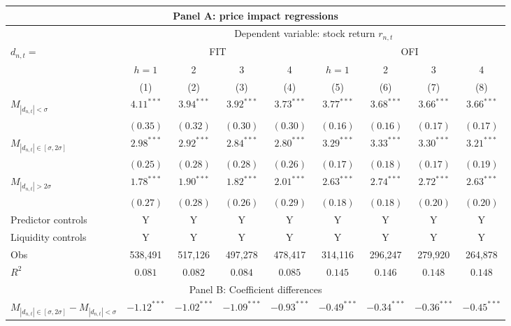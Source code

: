 \begin{tabular}{lcccccccc}
  \hline \multicolumn{9}{c}{Panel A: price impact regressions} \\
 \hline 
    & \multicolumn{8}{c}{Dependent variable: stock return $r_{n,t}$} \\

    \cmidrule(l){2-9} $d_{n,t} = $ & \multicolumn{4}{c}{FIT} & \multicolumn{4}{c}{OFI} \\
 \cmidrule(l){2-5} \cmidrule(l){6-9} 
  & $h=1$ & 2 & 3 & 4 & $h=1$ & 2 & 3 & 4 \\ 
   \cmidrule(l){2-5} \cmidrule(l){6-9} \vspace{5pt} & (1) & (2) & (3) & (4) & (5) & (6) & (7) & (8) \\ 
  $M_{|d_{n,t}| < \sigma}$ & $4.11^{***}$ & $3.94^{***}$ & $3.92^{***}$ & $3.73^{***}$ & $3.77^{***}$ & $3.68^{***}$ & $3.66^{***}$ & $3.66^{***}$ \\ 
   & $(0.35)$ & $(0.32)$ & $(0.30)$ & $(0.30)$ & $(0.16)$ & $(0.16)$ & $(0.17)$ & $(0.17)$ \\ 
  $M_{|d_{n,t}| \in [\sigma, 2\sigma]}$ & $2.98^{***}$ & $2.92^{***}$ & $2.84^{***}$ & $2.80^{***}$ & $3.29^{***}$ & $3.33^{***}$ & $3.30^{***}$ & $3.21^{***}$ \\ 
   & $(0.25)$ & $(0.28)$ & $(0.28)$ & $(0.26)$ & $(0.17)$ & $(0.18)$ & $(0.17)$ & $(0.19)$ \\ 
  $M_{|d_{n,t}| > 2 \sigma}$ & $1.78^{***}$ & $1.90^{***}$ & $1.82^{***}$ & $2.01^{***}$ & $2.63^{***}$ & $2.74^{***}$ & $2.72^{***}$ & $2.63^{***}$ \\ 
   \vspace{5pt} & $(0.27)$ & $(0.28)$ & $(0.26)$ & $(0.29)$ & $(0.18)$ & $(0.18)$ & $(0.20)$ & $(0.20)$ \\ 
  Predictor controls & Y & Y & Y & Y & Y & Y & Y & Y \\ 
   \vspace{5pt}Liquidity controls & Y & Y & Y & Y & Y & Y & Y & Y \\ 
  Obs & 538,491 & 517,126 & 497,278 & 478,417 & 314,116 & 296,247 & 279,920 & 264,878 \\ 
  $R^2$ & $0.081$ & $0.082$ & $0.084$ & $0.085$ & $0.145$ & $0.146$ & $0.148$ & $0.148$ \\ 
   \hline \multicolumn{9}{c}{Panel B: Coefficient differences} \\
 \hline$M_{|d_{n,t}| \in [\sigma, 2\sigma]}-M_{|d_{n,t}| < \sigma}$ & $-1.12^{***}$ & $-1.02^{***}$ & $-1.09^{***}$ & $-0.93^{***}$ & $-0.49^{***}$ & $-0.34^{***}$ & $-0.36^{***}$ & $-0.45^{***}$ \\ 

\end{tabular}
